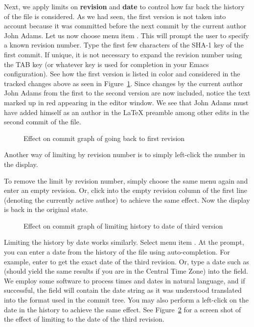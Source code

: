 Next, we apply limits on \textbf{revision} and \textbf{date} to control how far back the history of the file is considered.  As we had seen, the first version is not taken into account because it was committed before the next commit by the current author John Adams.  Let us now choose menu item .  This will prompt the user to specify a known revision number.  Type the first few characters  of the SHA-1 key of the first commit.  If unique, it is not necessary to expand the revision number using the TAB key (or whatever key is used for completion in your Emacs configuration).  See how the first version is listed in color and considered in the tracked changes above as seen in Figure~\ref{fig:emacs-limit-rev}.  Since changes by the current author John Adams from the first to the second version are now included, notice the text marked up in red appearing in the editor window. We see that John Adams must have added himself as an author in the LaTeX preamble among other edits in the second commit of the file. 

\begin{figure}
\centering
{}
\caption{Effect on commit graph of going back to first revision} \label{fig:emacs-limit-rev}
\end{figure}

Another way of limiting by revision number is to simply left-click the number in the display.  

To remove the limit by revision number, simply choose the same menu  again and enter an empty revision. Or, click into the empty revision column of the first line (denoting the currently active author) to achieve the same effect.  Now the display is back in the original state.

\begin{figure}
\centering
{}
\caption{Effect on commit graph of limiting history to date of third version} \label{fig:emacs-limit-date}
\end{figure}

Limiting the history by date works similarly.  Select menu item . At the prompt, you can enter a date from the history of the file using auto-completion.  For example, enter  to get the exact date of the third revision.  Or, type a date such as  (should yield the same results if you are in the Central Time Zone) into the field.  We employ some software to process times and dates in natural language, and if successful, the field will contain the date string as it was understood translated into the format used in the commit tree. You may also perform a left-click on the date in the history to achieve the same effect.  See Figure~\ref{fig:emacs-limit-date} for a screen shot of the effect of limiting to the date of the third revision. 

